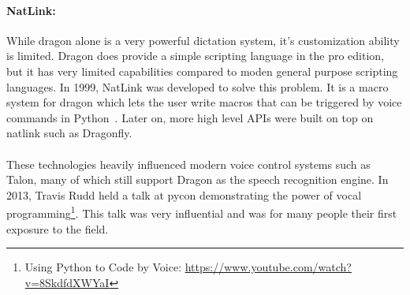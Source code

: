 \documentclass[../thesis.tex]{subfiles}
\begin{document}
\paragraph{NatLink:}
While dragon alone is a very powerful dictation system, it's customization ability is limited.
Dragon does provide a simple scripting language in the pro edition, but it has very limited capabilities compared to
moden general purpose scripting languages.
In 1999, NatLink was developed to solve this problem. It is a macro system for dragon which lets the user write macros that can be triggered by voice commands
in Python~\parencite{gould2001implementation}.
Later on, more high level APIs were built on top on natlink such as Dragonfly. %

\paragraph{}
These technologies heavily influenced modern voice control systems such as Talon,
many of which still support Dragon as the speech recognition engine.
In 2013, Travis Rudd held a talk at pycon demonstrating the power
of vocal programming\footnote{Using Python to Code by Voice: \url{https://www.youtube.com/watch?v=8SkdfdXWYaI}}.
This talk was very influential and was for many people
their first exposure to the field.






\end{document}
